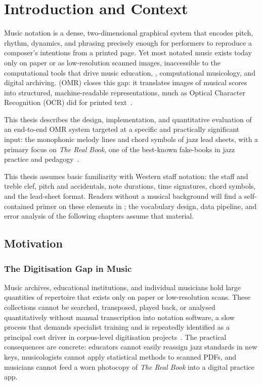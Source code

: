 \chapter{Introduction and Context}%
\label{ch:intro}

Music notation is a dense, two-dimensional graphical system that encodes pitch, rhythm,
dynamics, and phrasing precisely enough for performers to reproduce a composer's
intentions from a printed page. Yet most notated music exists today only on paper or as
low-resolution scanned images, inaccessible to the computational tools that drive music
education, , computational musicology, and digital
archiving.  (OMR) closes this gap: it translates
images of musical scores into structured, machine-readable representations, much as
Optical Character Recognition (OCR) did for printed text~\cite{shatriOPTICALMUSICRECOGNITION}.

This thesis describes the design, implementation, and quantitative evaluation of an
end-to-end OMR system targeted at a specific and practically significant input: the
monophonic melody lines and chord symbols of jazz lead sheets, with a primary focus on
\textit{The Real Book}, one of the best-known fake-books in jazz practice and
pedagogy~\cite{kernfeldStoryFakeBooks2006}.

\smallskip
This thesis assumes basic familiarity with Western staff notation: the staff and treble
clef, pitch and accidentals, note durations, time signatures, chord symbols, and the
lead-sheet format. Readers without a musical background will find a self-contained
primer on these elements in ; the vocabulary design, data
pipeline, and error analysis of the following chapters assume that material.

\section{Motivation}
\label{sec:motivation}

\subsection{The Digitisation Gap in Music}

Music archives, educational institutions, and individual musicians hold large quantities
of repertoire that exists only on paper or low-resolution scans. These collections cannot
be searched, transposed, played back, or analysed quantitatively without manual
transcription into notation software, a slow process that demands specialist
training and is repeatedly identified as a principal cost driver in corpus-level
digitisation projects~\cite{calvoZaragozaUnderstandingOMR2020, hajicOMRMetricsEvaluation2019}.
The practical consequences are concrete: educators cannot easily reassign jazz standards in
new keys, musicologists cannot apply statistical methods to scanned PDFs, and musicians
cannot feed a worn photocopy of \textit{The Real Book} into a digital practice app.

